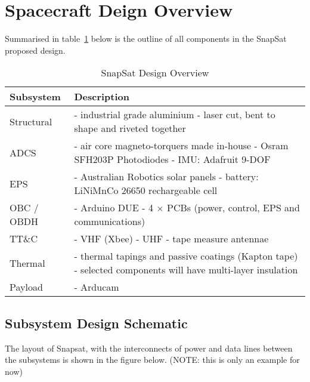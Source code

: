 \section{Spacecraft Deign Overview}
Summarised in table~\ref{tab:designoverview} below is the outline of all components in the SnapSat proposed design.

\begin{table}[H]
    \centering
    \caption{SnapSat Design Overview}
    \vspace{0.15cm}
    \label{tab:designoverview}
    {\renewcommand{\arraystretch}{1.4}%
        \begin{tabular}{|>{\arraybackslash}m{3cm}|>{\arraybackslash}m{10cm}|}
            \hline
            \textbf{Subsystem} & \textbf{Description} \\ \hline\hline
            Structural & - industrial grade aluminium \newline - laser cut, bent to shape and riveted together \\\hline
            ADCS & - air core magneto-torquers made in-house \newline - Osram SFH203P Photodiodes \newline - IMU: Adafruit 9-DOF  \\\hline
            EPS & - Australian Robotics solar panels \newline - battery: LiNiMnCo 26650 rechargeable cell  \\\hline
            OBC / OBDH & - Arduino DUE \newline - 4 $\times$ PCBs (power, control, EPS and communications)  \\\hline
           TT\&C & - VHF (Xbee) \newline - UHF \newline - tape measure antennae \\\hline
           Thermal & - thermal tapings and passive coatings (Kapton tape) \newline - selected components will have multi-layer insulation \\\hline
           Payload & - Arducam \\\hline
        \end{tabular} } 
    \end{table}
    
\subsection{Subsystem Design Schematic}
The layout of Snapsat, with the interconnects of power and data lines between the subsystems is shown in the figure below. (NOTE: this is only an example for now)

\begin{figure}[H]
\end{figure}
